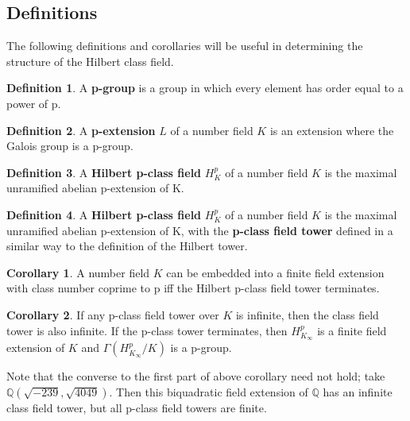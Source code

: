 \documentclass[12pt]{extarticle}
\newcommand{\<}{\langle}
\renewcommand{\>}{\rangle}
\theoremstyle{definition}
\newtheorem{corollary}{Corollary}
\newtheorem*{definition}{Definition}
\begin{document}
\subsection{Definitions}
The following definitions and corollaries will be useful in determining the structure of the Hilbert class field. 
\begin{definition}
A \textbf{p-group} is a group in which every element has order equal to a power of p.
\end{definition}
\begin{definition}
A \textbf{p-extension} $L$ of a number field $K$ is an extension where the Galois group is a p-group.
\end{definition}
\begin{definition}
A \textbf{Hilbert p-class field} $H_K^{p}$ of a number field $K$ is the maximal unramified abelian p-extension of K.
\end{definition}
\begin{definition}
A \textbf{Hilbert p-class field} $H_K^{p}$ of a number field $K$ is the maximal unramified abelian p-extension of K, with the \textbf{p-class field tower} defined in a similar way to the definition of the Hilbert tower. 
\end{definition}
\begin{corollary}
 A number field $K$ can be embedded into a finite field extension with class number coprime to p iff the Hilbert p-class field tower terminates.
\end{corollary}
\begin{corollary}
If any p-class field tower over $K$ is infinite, then the class field tower is also infinite. If the p-class tower terminates, then $H_{K_\infty}^{p}$ is a finite field extension of $K$ and $\Gamma(H_{K_\infty}^{p}/K)$ is a p-group.
\end{corollary}
Note that the converse to the first part of above corollary need not hold; take $\mathbb{Q}\left(\sqrt{-239},\sqrt{4049}\right)$. Then this biquadratic field extension of $\mathbb{Q}$ has an infinite class field tower, but all p-class field towers are finite. 
\end{document}
